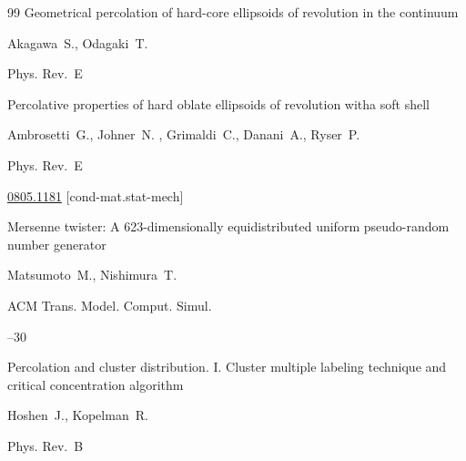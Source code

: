 {\begin{thebibliography}{99}
\paper Geometrical percolation of hard-core ellipsoids of revolution in the continuum

\by Akagawa~S., Odagaki~T.

\jour Phys. Rev.~E










\paper Percolative properties of hard oblate ellipsoids of revolution witha soft shell

\by Ambrosetti~G., Johner~N. , Grimaldi~C., Danani~A., Ryser~P.

\jour Phys. Rev.~E






\arxiv \href{http://arxiv.org/abs/0805.1181}{0805.1181} [cond-mat.stat-mech]




\paper Mersenne twister: A 623-dimensionally equidistributed uniform pseudo-random number generator

\by Matsumoto~M., Nishimura~T.

\jour ACM Trans. Model. Comput. Simul.




--30










\paper Percolation and cluster distribution. I. Cluster multiple labeling technique and critical concentration algorithm

\by Hoshen~J., Kopelman~R.

\jour Phys. Rev.~B





\end{thebibliography}}
